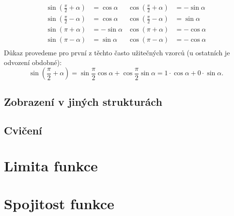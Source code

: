        \begin{align*}
          \sin\left(\frac{\pi}{2}+\alpha\right) &=  \cos\alpha  &   \cos\left(\frac{\pi}{2}+\alpha\right) &= -\sin\alpha \\
          \sin\left(\frac{\pi}{2}-\alpha\right) &=  \cos\alpha  &   \cos\left(\frac{\pi}{2}-\alpha\right) &=  \sin\alpha \\
          \sin\left(\pi+\alpha\right)           &= -\sin\alpha  &   \cos\left(\pi+\alpha\right)           &= -\cos\alpha \\
          \sin\left(\pi-\alpha\right)           &=  \sin\alpha  &   \cos\left(\pi-\alpha\right)           &= -\cos\alpha \\
        \end{align*}
        \newline Důkaz provedeme pro první z těchto často užitečných vzorců (u ostatních je odvození obdobné):
        $$\sin\left(\frac{\pi}{2}+\alpha\right) = \sin\frac{\pi}{2}\cos\alpha + \cos\frac{\pi}{2}\sin\alpha = 1\cdot\cos\alpha + 0\cdot\sin\alpha.$$

    \subsection{Zobrazení v jiných strukturách}
    
    \subsection{Cvičení}
  \section{Limita funkce}
  
  \section{Spojitost funkce}
  
\printbibliography[title={Seznam literatury}, heading=subbibliography]
